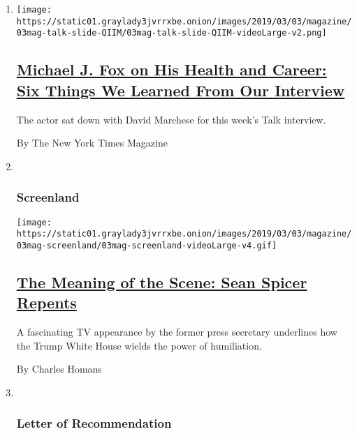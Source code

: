 \begin{enumerate}
\def\labelenumi{\arabic{enumi}.}
\item
  \texttt{[image: https://static01.graylady3jvrrxbe.onion/images/2019/03/03/magazine/03mag-talk-slide-QIIM/03mag-talk-slide-QIIM-videoLarge-v2.png]}

  \hypertarget{michael-j-fox-on-his-health-and-career-six-things-we-learned-from-our-interview}{%
  \subsection{\texorpdfstring{\href{/2019/03/01/magazine/michael-j-fox-health-interview.html}{Michael
  J. Fox on His Health and Career: Six Things We Learned From Our
  Interview}}{Michael J. Fox on His Health and Career: Six Things We Learned From Our Interview}}\label{michael-j-fox-on-his-health-and-career-six-things-we-learned-from-our-interview}}

  The actor sat down with David Marchese for this week's Talk interview.

  By The New York Times Magazine
\item ~
  \hypertarget{screenland}{%
  \subsubsection{Screenland}\label{screenland}}

  \texttt{[image: https://static01.graylady3jvrrxbe.onion/images/2019/03/03/magazine/03mag-screenland/03mag-screenland-videoLarge-v4.gif]}

  \hypertarget{the-meaning-of-the-scene-sean-spicer-repents}{%
  \subsection{\texorpdfstring{\href{/2019/02/27/magazine/the-meaning-of-the-scene-sean-spicer-repents.html}{The
  Meaning of the Scene: Sean Spicer
  Repents}}{The Meaning of the Scene: Sean Spicer Repents}}\label{the-meaning-of-the-scene-sean-spicer-repents}}

  A fascinating TV appearance by the former press secretary underlines
  how the Trump White House wields the power of humiliation.

  By Charles Homans
\item ~
  \hypertarget{letter-of-recommendation}{%
  \subsubsection{Letter of
  Recommendation}\label{letter-of-recommendation}}


\end{enumerate}
